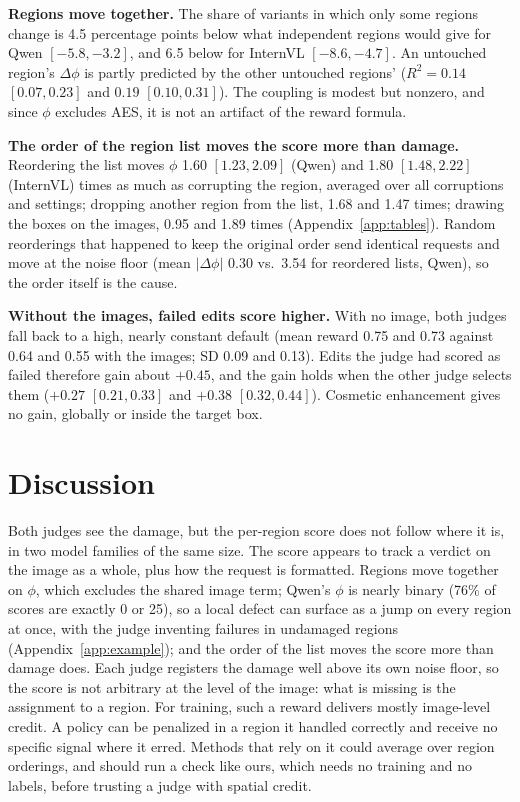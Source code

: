 \documentclass[10pt,a4paper]{article}
\begin{document}
\textbf{Regions move together.} The share of variants in which only some regions change is 4.5 percentage points below what independent regions would give for Qwen $[-5.8, -3.2]$, and 6.5 below for InternVL $[-8.6, -4.7]$. An untouched region's $\Delta\phi$ is partly predicted by the other untouched regions' ($R^2 = 0.14$ $[0.07, 0.23]$ and $0.19$ $[0.10, 0.31]$). The coupling is modest but nonzero, and since $\phi$ excludes AES, it is not an artifact of the reward formula.

\textbf{The order of the region list moves the score more than damage.} Reordering the list moves $\phi$ 1.60 $[1.23, 2.09]$ (Qwen) and 1.80 $[1.48, 2.22]$ (InternVL) times as much as corrupting the region, averaged over all corruptions and settings; dropping another region from the list, 1.68 and 1.47 times; drawing the boxes on the images, 0.95 and 1.89 times (Appendix~\ref{app:tables}). Random reorderings that happened to keep the original order send identical requests and move at the noise floor (mean $|\Delta\phi|$ 0.30 vs.\ 3.54 for reordered lists, Qwen), so the order itself is the cause.

\textbf{Without the images, failed edits score higher.} With no image, both judges fall back to a high, nearly constant default (mean reward 0.75 and 0.73 against 0.64 and 0.55 with the images; SD 0.09 and 0.13). Edits the judge had scored as failed therefore gain about $+0.45$, and the gain holds when the other judge selects them ($+0.27$ $[0.21, 0.33]$ and $+0.38$ $[0.32, 0.44]$). Cosmetic enhancement gives no gain, globally or inside the target box.


\section{Discussion}

Both judges see the damage, but the per-region score does not follow where it is, in two model families of the same size. The score appears to track a verdict on the image as a whole, plus how the request is formatted. Regions move together on $\phi$, which excludes the shared image term; Qwen's $\phi$ is nearly binary (76\% of scores are exactly 0 or 25), so a local defect can surface as a jump on every region at once, with the judge inventing failures in undamaged regions (Appendix~\ref{app:example}); and the order of the list moves the score more than damage does. Each judge registers the damage well above its own noise floor, so the score is not arbitrary at the level of the image: what is missing is the assignment to a region. For training, such a reward delivers mostly image-level credit. A policy can be penalized in a region it handled correctly and receive no specific signal where it erred. Methods that rely on it could average over region orderings, and should run a check like ours, which needs no training and no labels, before trusting a judge with spatial credit.
\end{document}
